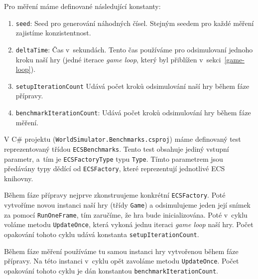 Pro měření máme definované následující konstanty:

\begin{enumerate}
  \item \texttt{seed}: Seed pro generování náhodných čísel. Stejným seedem pro každé měření zajistíme konzistentnost.

  \item \texttt{deltaTime}: Čas v~sekundách. Tento čas používáme pro odsimulovaní jednoho kroku naší hry (jedné iterace \textit{game loop}, který byl přiblížen v~sekci~\ref{game-loop}).

  \item \texttt{setupIterationCount} Udává počet kroků odsimulování naší hry během fáze přípravy.

  \item \texttt{benchmarkIterationCount}: Udává počet kroků odsimulování hry během fáze měření.
\end{enumerate}

V C\# projektu (\texttt{WorldSimulator.Benchmarks.csproj}) máme definovaný test reprezentovaný třídou \texttt{ECSBenchmarks}. Tento test obsahuje jediný vstupní parametr, a~tím je \texttt{ECSFactoryType} typu \texttt{Type}. Tímto parametrem jsou předávány typy dědící od \texttt{ECSFactory}, které reprezentují jednotlivé ECS knihovny.

Během fáze přípravy nejprve zkonstruujeme konkrétní \texttt{ECSFactory}. Poté vytvoříme novou instanci naší hry (třídy \texttt{Game}) a odsimulujeme jeden její snímek za pomocí \texttt{RunOneFrame}, tím zaručíme, že hra bude inicializována. Poté v~cyklu voláme metodu \texttt{UpdateOnce}, která vykoná jednu iteraci \textit{game loop} naší hry. Počet opakování tohoto cyklu udává konstanta \texttt{setupIterationCount}.

Během fáze měření používáme tu samou instanci hry vytvořenou během fáze přípravy. Na této instanci v~cyklu opět zavoláme metodu \texttt{UpdateOnce}. Počet opakování tohoto cyklu je dán konstantou \texttt{benchmarkIterationCount}.












